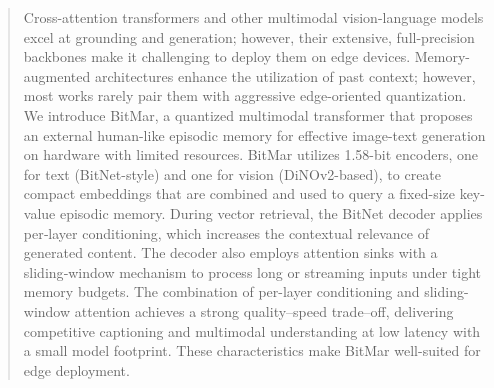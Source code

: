 \begin{abstract}
Cross-attention transformers and other multimodal vision-language models excel at grounding and generation; however, their extensive, full-precision backbones make it challenging to deploy them on edge devices. Memory-augmented architectures enhance the utilization of past context; however, most works rarely pair them with aggressive edge-oriented quantization. We introduce BitMar, a quantized multimodal transformer that proposes an external human-like episodic memory for effective image-text generation on hardware with limited resources. BitMar utilizes 1.58-bit encoders, one for text (BitNet-style) and one for vision (DiNOv2-based), to create compact embeddings that are combined and used to query a fixed-size key-value episodic memory. During vector retrieval, the BitNet decoder applies per‑layer conditioning, which increases the contextual relevance of generated content. The decoder also employs attention sinks with a sliding‑window mechanism to process long or streaming inputs under tight memory budgets. The combination of per-layer conditioning and sliding-window attention achieves a strong quality–speed trade–off, delivering competitive captioning and multimodal understanding at low latency with a small model footprint. These characteristics make BitMar well-suited for edge deployment.





\end{abstract}
